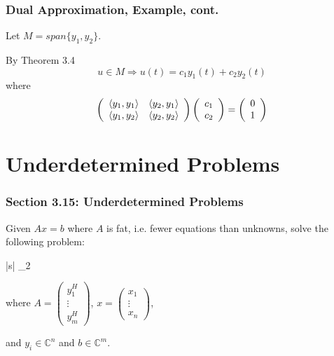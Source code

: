 \documentclass{beamer}
\begin{document}
\begin{frame}\frametitle{Dual Approximation, Example, cont.}	
		
	Let $M = span\{y_1,y_2\}$.

	By Theorem 3.4 
	\[ 
	u \in M \Rightarrow u(t) = c_1y_1(t) + c_2y_2(t) 
	\]
	where
	\[ \left(
	\begin{array}{cc}
	\left<y_1,y_1 \right> & \left<y_2,y_1 \right>\\
	\left<y_1,y_2 \right> & \left<y_2,y_2 \right>
	\end{array}
	\right)\left(
	\begin{array}{c}
	c_1\\
	c_2
	\end{array}
	\right) = \left(
	\begin{array}{c}
	0\\1
	\end{array}
	\right) \]

\end{frame}



\section{Underdetermined Problems}
\frame{\sectionpage}

\begin{frame}\frametitle{Section 3.15: Underdetermined Problems}
		Given $Ax = b$ where $A$ is fat, i.e. fewer equations than unknowns,
	solve the following problem:
		\begin{mini*}|s|
		{}{_2}{}{}
		\end{mini*}
	where
	$A = \left(
		\begin{array}{c}
		y_1^H\\
		\vdots\\
		y_m^H
		\end{array}
		\right)$, 
	$x = \left(
		\begin{array}{c}
		x_1\\
		\vdots\\
		x_n
		\end{array}
		\right)$, 
	
	and $y_i \in \mathbb{C}^n$ and $b \in \mathbb{C}^m$.

\end{frame}
\end{document}
